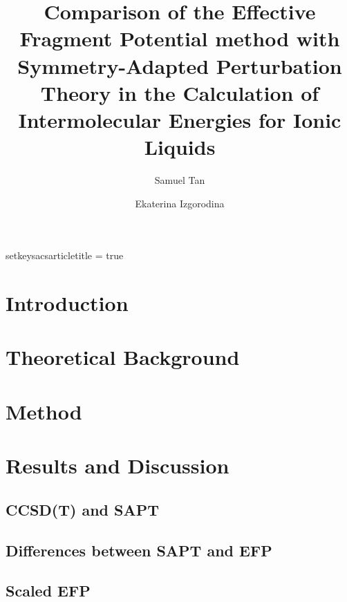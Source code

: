 \documentclass[journal = jctcce]{achemso}
\title{Comparison of the Effective Fragment Potential method with Symmetry-Adapted Perturbation Theory in the Calculation of Intermolecular Energies for Ionic Liquids}
\author{Samuel Tan}
\author{Ekaterina Izgorodina}
\affiliation[Monash University]
    {Monash University, Australia}
\begin{document}
setkeys{acs}{articletitle = true}

%
\clearpage

\maketitle

\section{Introduction}


\section{Theoretical Background}


\section{Method}

\section{Results and Discussion}


\subsection{CCSD(T) and SAPT}


\subsection{Differences between SAPT and EFP}


\subsection{Scaled EFP}

\end{document}
